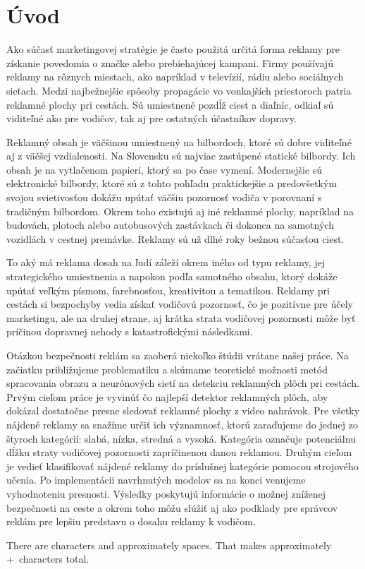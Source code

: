 \chapter*{Úvod}\label{chap:intro}


Ako súčasť marketingovej stratégie je často použitá určitá forma reklamy pre získanie povedomia o značke alebo prebiehajúcej kampani. Firmy používajú reklamy na rôznych miestach, ako napríklad v televízií, rádiu alebo sociálnych sieťach. Medzi najbežnejšie spôsoby propagácie vo vonkajších priestoroch patria reklamné plochy pri cestách. Sú umiestnené pozdĺž ciest a diaľníc, odkiaľ sú viditeľné ako pre vodičov, tak aj pre ostatných účastníkov dopravy. 

Reklamný obsah je väčšinou umiestnený na bilbordoch, ktoré sú dobre viditeľné aj z väčšej vzdialenosti. Na Slovensku sú najviac zastúpené statické bilbordy. Ich obsah je na vytlačenom papieri, ktorý sa po čase vymení. Modernejšie sú elektronické bilbordy, ktoré sú z tohto pohľadu praktickejšie a predovšetkým svojou svietivosťou dokážu upútať väčšiu pozornosť vodiča v porovnaní s tradičným bilbordom. Okrem toho existujú aj iné reklamné plochy, napríklad na budovách, plotoch alebo autobusových zastávkach či dokonca na samotných vozidlách v cestnej premávke. Reklamy sú už dlhé roky bežnou súčasťou ciest.

To aký má reklama dosah na ľudí záleží okrem iného od typu reklamy, jej strategického umiestnenia a napokon podľa samotného obsahu, ktorý dokáže upútať veľkým písmom, farebnosťou, kreativitou a tematikou. Reklamy pri cestách si bezpochyby vedia získať vodičovú pozornosť, čo je pozitívne pre účely marketingu, ale na druhej strane, aj krátka strata vodičovej pozornosti môže byť príčinou dopravnej nehody s katastrofickými následkami. 

Otázkou bezpečnosti reklám sa zaoberá niekoľko štúdii vrátane našej práce. Na začiatku približujeme problematiku a skúmame teoretické možnosti metód spracovania obrazu a neurónových sietí na detekciu reklamných plôch pri cestách. Prvým cieľom práce je vyvinúť čo najlepší detektor reklamných plôch, aby dokázal dostatočne presne sledovať reklamné plochy z video nahrávok. Pre všetky nájdené reklamy sa snažíme určiť ich významnosť, ktorú zaraďujeme do jednej zo štyroch kategórií: slabá, nízka, stredná a vysoká. Kategória označuje potenciálnu dĺžku straty vodičovej pozornosti zapríčinenou danou reklamou. Druhým cieľom je vedieť klasifikovať nájdené reklamy do príslušnej kategórie pomocou strojového učenia. Po implementácii navrhnutých modelov sa na konci venujeme vyhodnoteniu presnosti. Výsledky poskytujú informácie o možnej zníženej bezpečnosti na ceste a okrem toho môžu slúžiť aj ako podklady pre správcov reklám pre lepšiu predstavu o dosahu reklamy k vodičom.


There are \thechar characters and approximately \theword spaces.
That makes approximately \the\numexpr\theword+\thechar\relax\ characters total.
